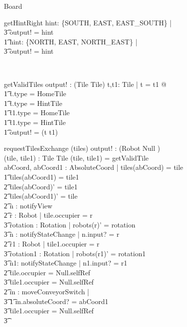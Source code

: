 \documentclass[12pt]{article}
\begin{document}
\begin{class}{Board}
\begin{schema}{getHintRight}
\THEN \exists hint: \{SOUTH, EAST, EAST\_SOUTH\} | \\ \t3 output! = hint \\ \t1
\ELSE \exists hint: \{NORTH, EAST, NORTH\_EAST\} | \\ \t3 output! = hint
\end{schema} \\
\begin{schema}{getValidTiles}
output! : (Tile \cross Tile)
\where
\exists t,t1: Tile | t \not = t1  @ \\ \t1
t.type \not = HomeTile \\ \t1
t.type \not = HintTile \\ \t1
t1.type \not = HomeTile \\ \t1
t1.type \not = HintTile \implies \\ \t1
output! = (t \cross t1)
\end{schema}
\znewpage
\begin{schema}{requestTilesExchange}
\Delta (tiles)
output! : ({Robot \union Null} ) \\
(tile, tile1) : Tile \cross Tile
\where
(tile, tile1)  = getValidTile \\
\exists abCoord, abCoord1 : AbsoluteCoord | tiles(abCoord) = tile \\ \t1
tiles(abCoord1) = tile1 \implies \\ \t2
tiles(abCoord)' = tile1 \\ \t2
tiles(abCoord1)' = tile \\ \t2
\exists n : notifyView \\ \t2
\exists r : Robot | tile.occupier = r \implies \\ \t3
\exists rotation : Rotation | robots(r)' = rotation \\ \t3
\exists n : notifyStateChange | n.input? = r \\ \t2
\exists r1 : Robot | tile1.occupier = r \implies \\ \t3
\exists rotation1 : Rotation | robots(r1)' = rotation1 \\ \t3
\exists n1: notifyStateChange | n1.input? = r1 \\ \t2
\IF tile.occupier = Null.selfRef \\ \t3
tile1.occupier \not = Null.selfRef\\ \t2
\THEN \exists m : moveConveyorSwitch | \\ \t3 \t1 m.absoluteCoord? = abCoord1 \\ \t3
\IF tile1.occupier = Null.selfRef \\ \t3

\end{schema}
\end{class}
\end{document}
